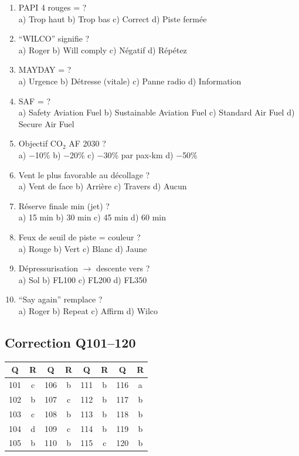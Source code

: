 \begin{enumerate}[nosep, start=101]
\item PAPI 4 rouges = ? \\ a) Trop haut \quad b) Trop bas \quad c) Correct \quad d) Piste fermée

\item ``WILCO'' signifie ? \\ a) Roger \quad b) Will comply \quad c) Négatif \quad d) Répétez

\item MAYDAY = ? \\ a) Urgence \quad b) Détresse (vitale) \quad c) Panne radio \quad d) Information

\item SAF = ? \\ a) Safety Aviation Fuel \quad b) Sustainable Aviation Fuel \quad c) Standard Air Fuel \quad d) Secure Air Fuel

\item Objectif CO$_2$ AF 2030 ? \\ a) $-$10\% \quad b) $-$20\% \quad c) $-$30\% par pax-km \quad d) $-$50\%

\item Vent le plus favorable au décollage ? \\ a) Vent de face \quad b) Arrière \quad c) Travers \quad d) Aucun

\item Réserve finale min (jet) ? \\ a) 15 min \quad b) 30 min \quad c) 45 min \quad d) 60 min

\item Feux de seuil de piste = couleur ? \\ a) Rouge \quad b) Vert \quad c) Blanc \quad d) Jaune

\item Dépressurisation $\to$ descente vers ? \\ a) Sol \quad b) FL100 \quad c) FL200 \quad d) FL350

\item ``Say again'' remplace ? \\ a) Roger \quad b) Repeat \quad c) Affirm \quad d) Wilco
\end{enumerate}

\subsection*{Correction Q101--120}

\begin{center}
\begin{tabular}{|c|c||c|c||c|c||c|c|}
\hline
\textbf{Q} & \textbf{R} & \textbf{Q} & \textbf{R} & \textbf{Q} & \textbf{R} & \textbf{Q} & \textbf{R} \\
\hline
101 & c & 106 & b & 111 & b & 116 & a \\
102 & b & 107 & c & 112 & b & 117 & b \\
103 & c & 108 & b & 113 & b & 118 & b \\
104 & d & 109 & c & 114 & b & 119 & b \\
105 & b & 110 & b & 115 & c & 120 & b \\
\hline
\end{tabular}
\end{center}
